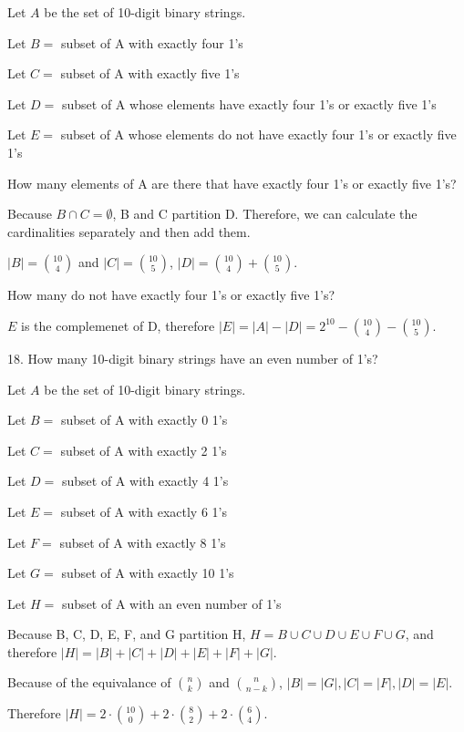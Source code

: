 \documentclass{idrisMemo}
\begin{document}
\begin{prooflist}{ Let $A$ be the set of 10-digit binary strings. }
    \item Let $B=$ subset of A with exactly four 1's
    \item Let $C=$ subset of A with exactly five 1's
    \item Let $D=$ subset of A whose elements have exactly four 1’s or exactly five 1’s
    \item Let $E=$ subset of A whose elements do not have exactly four 1’s or exactly five 1’s
    \item How many elements of A are there that have exactly four 1’s or exactly five 1’s?
    \item Because $B \cap C=\emptyset$, B and C partition D. Therefore, we can
        calculate the cardinalities separately and then add them.
    \item $|B|=\binom{10}{4}$ and $|C|=\binom{10}{5}$, $|D|= \binom{10}{4}+\binom{10}{5}$.
    \item How many do not have exactly four 1’s or exactly five 1’s?
    \item $E$ is the complemenet of D, therefore $|E| = |A| - |D| = 2^{10} -
        \binom{10}{4}-\binom{10}{5}$.
\end{prooflist}

\begin{prooflist}{18. How many 10-digit binary strings have an even number of 1’s?}
    \item Let $A$ be the set of 10-digit binary strings.
    \item Let $B=$ subset of A with exactly 0 1's
    \item Let $C=$ subset of A with exactly 2 1's
    \item Let $D=$ subset of A with exactly 4 1's
    \item Let $E=$ subset of A with exactly 6 1's
    \item Let $F=$ subset of A with exactly 8 1's
    \item Let $G=$ subset of A with exactly 10 1's
    \item Let $H=$ subset of A with an even number of 1's
    \item Because B, C, D, E, F, and G partition H, $H=B\cup C\cup D\cup E \cup
        F \cup G$, and therefore $|H|=|B| + |C| + |D| + |E| + |F| + |G|$.
    \item Because of the equivalance of $\binom{n}{k}$ and $\binom{n}{n-k}$,
        $|B|=|G|, |C|=|F|, |D|=|E|$.
    \item Therefore $|H| =
        2\cdot \binom{10}{0} +
        2\cdot \binom{8}{2} +
        2\cdot \binom{6}{4}$.
\end{prooflist}
\end{document}
